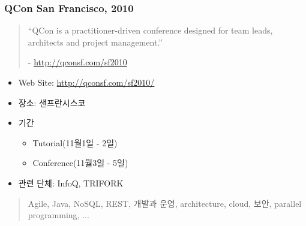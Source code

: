 \begin{frame}
\frametitle{QCon San Francisco, 2010}

\begin{quotation}
``QCon is a practitioner-driven conference designed for team leads, architects and project management.''

- \url{http://qconsf.com/sf2010}
\end{quotation}

\begin{itemize}
  \item Web Site: \url{http://qconsf.com/sf2010/}
  \item 장소: 샌프란시스코
  \item 기간
    \begin{itemize}
    \item Tutorial(11월1일 - 2일)
    \item Conference(11월3일 - 5일)
    \end{itemize}
  \item 관련 단체: InfoQ, TRIFORK
\end{itemize}

\begin{quote}
Agile, Java, NoSQL, REST, 개발과 운영, architecture, cloud, 보안, parallel programming, ...
\end{quote}

\end{frame}
